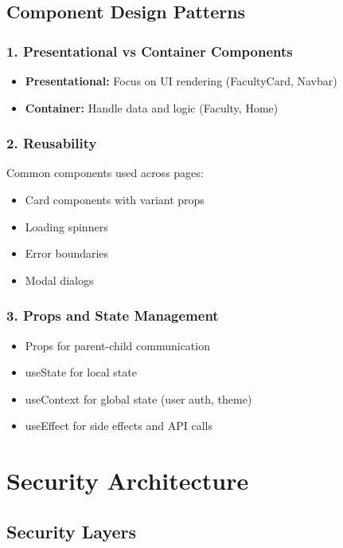 \documentclass[12pt,a4paper]{report}
\begin{document}
\subsection*{Component Design Patterns}

\subsubsection*{1. Presentational vs Container Components}
\begin{itemize}
    \item \textbf{Presentational:} Focus on UI rendering (FacultyCard, Navbar)
    \item \textbf{Container:} Handle data and logic (Faculty, Home)
\end{itemize}

\subsubsection*{2. Reusability}
Common components used across pages:
\begin{itemize}
    \item Card components with variant props
    \item Loading spinners
    \item Error boundaries
    \item Modal dialogs
\end{itemize}

\subsubsection*{3. Props and State Management}
\begin{itemize}
    \item Props for parent-child communication
    \item useState for local state
    \item useContext for global state (user auth, theme)
    \item useEffect for side effects and API calls
\end{itemize}

\section{Security Architecture}

\subsection*{Security Layers}
\end{document}

